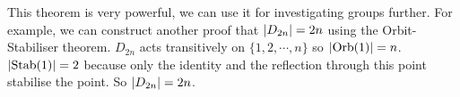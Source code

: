 This theorem is very powerful, we can use it for investigating groups further. For example, we can construct another proof that \(\abs{D_{2n}} = 2n\) using the Orbit-Stabiliser theorem. \(D_{2n}\) acts transitively on \(\{1, 2, \cdots, n\}\) so \(\abs{\operatorname{Orb}(1)} = n\). \(\abs{\operatorname{Stab}(1)} = 2\) because only the identity and the reflection through this point stabilise the point. So \(\abs{D_{2n}} = 2n\).
